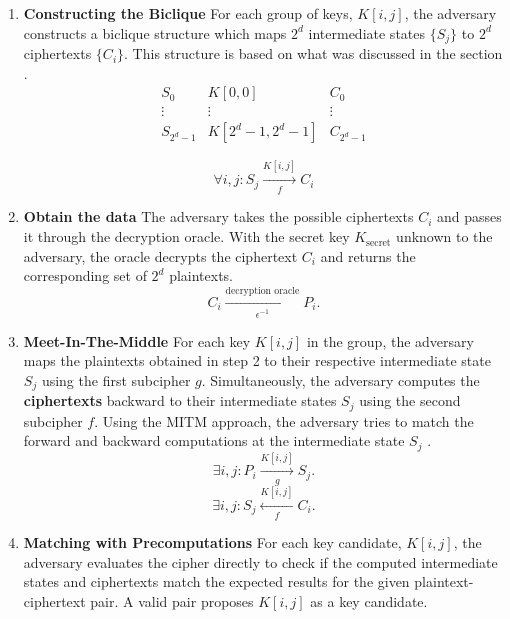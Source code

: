 \documentclass{report}
\begin{document}
 \begin{enumerate}[start = 1, label={(\bfseries Step\arabic*):}]
    \item \textbf{Constructing the Biclique} For each group of keys, \( K[i, j] \), the adversary constructs a biclique structure which maps \( 2^d \) intermediate states \( \{S_j\} \) to \( 2^d \) ciphertexts \( \{C_i\} \). This structure is based on what was discussed in the section \textit{}.
            \begin{equation}
                \begin{array}{ccc}
                    S_0 & K[0,0] & C_0 \\
                    \vdots & \vdots & \vdots \\
                    S_{2^d-1} & K[2^d-1,2^d-1] & C_{2^d-1}
                    \end{array}
            \end{equation}
                
            \begin{equation}
                \forall i, j : S_j \xrightarrow[\quad f \quad]{K[i, j]} C_i
            \end{equation}

    \item \textbf{Obtain the data} The adversary takes the possible ciphertexts $C_i$ and passes it through the decryption oracle. With the secret key $K_{\text{secret}}$ unknown to the adversary, the oracle decrypts the ciphertext $C_i$ and returns the corresponding set of $2^d$ plaintexts.
            \begin{equation}
                C_i \xrightarrow[\epsilon^{-1}]{\text{decryption oracle}} P_i.
            \end{equation}
    \item \textbf{Meet-In-The-Middle} For each key $K[i, j]$ in the group, the adversary maps the plaintexts obtained in step 2 to their respective intermediate state $S_j$ using the first subcipher $g$. Simultaneously, the adversary computes the \textbf{ciphertexts} backward to their intermediate states $S_j$ using the second subcipher $f$. Using the MITM approach, the adversary tries to match the forward and backward computations at the intermediate state $S_j$ .
            \begin{equation}
                \exists i, j : P_i \xrightarrow[g]{K[i, j]} S_j.
            \end{equation}
            \begin{equation}
                \exists i, j : S_j \xleftarrow[f]{K[i, j]} C_i.
            \end{equation}
    \item \textbf{Matching with Precomputations} For each key candidate, $K[i, j]$, the adversary evaluates the cipher directly to check if the computed intermediate states and ciphertexts match the expected results for the given plaintext-ciphertext pair. A valid pair proposes $K[i, j]$ as a key candidate.


 \end{enumerate}
\end{document}
